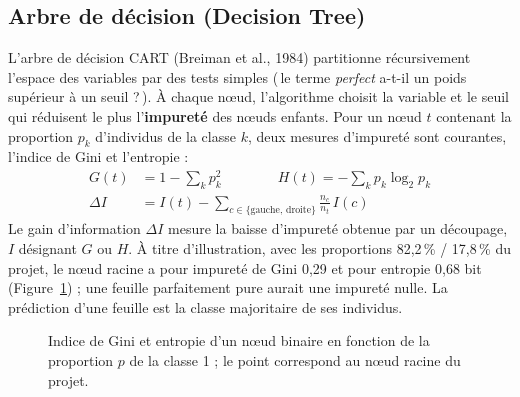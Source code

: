 \documentclass[11pt,a4paper]{report}
\def\og{\guillemotleft\nobreak\,}%
\def\fg{\unskip\nobreak\,\guillemotright}%
\newcommand{\gl}[1]{\og #1\fg{}}       %
\numberwithin{equation}{chapter}
\begin{document}
\subsection{Arbre de décision (Decision Tree)}
L'arbre de décision CART (Breiman et al., 1984) partitionne récursivement l'espace des variables par des tests simples (\gl{le terme \textit{perfect} a-t-il un poids supérieur à un seuil ?}). À chaque n\oe ud, l'algorithme choisit la variable et le seuil qui réduisent le plus l'\textbf{impureté} des n\oe uds enfants. Pour un n\oe ud $t$ contenant la proportion $p_k$ d'individus de la classe $k$, deux mesures d'impureté sont courantes, l'indice de Gini et l'entropie :
\begin{align}
G(t) &= 1 - \sum_k p_k^2 \qquad\qquad H(t) = -\sum_k p_k \log_2 p_k \label{eq:gini}\\
\Delta I &= I(t) - \sum_{c\in\{\text{gauche},\,\text{droite}\}} \frac{n_c}{n_t}\, I(c) \label{eq:gain}
\end{align}
Le gain d'information $\Delta I$ mesure la baisse d'impureté obtenue par un découpage, $I$ désignant $G$ ou $H$. À titre d'illustration, avec les proportions 82,2\,\% / 17,8\,\% du projet, le n\oe ud racine a pour impureté de Gini 0,29 et pour entropie 0,68 bit (Figure~\ref{fig:gini}) ; une feuille parfaitement pure aurait une impureté nulle. La prédiction d'une feuille est la classe majoritaire de ses individus.

\begin{figure}[!htbp]
\centering
{}
\caption{Indice de Gini et entropie d'un n\oe ud binaire en fonction de la proportion $p$ de la classe 1 ; le point correspond au n\oe ud racine du projet.}\label{fig:gini}
\end{figure}
\end{document}
